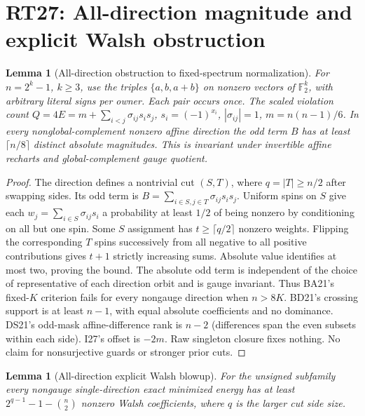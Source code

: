 \documentclass[11pt]{article}
\newtheorem{lemma}[theorem]{Lemma}
\begin{document}
\section{RT27: All-direction magnitude and explicit Walsh obstruction}\label{sec:rt27}
\begin{lemma}[All-direction obstruction to fixed-spectrum normalization]\label{lem:rt27-spectrum}
For $n=2^k-1$, $k\ge3$, use the triples $\{a,b,a+b\}$ on nonzero vectors of $\mathbb F_2^k$, with arbitrary literal signs per owner. Each pair occurs once. The scaled violation count $Q=4E=m+\sum_{i<j}\sigma_{ij}s_i s_j$, $s_i=(-1)^{x_i}$, $|\sigma_{ij}|=1$, $m=n(n-1)/6$. In every nonglobal-complement nonzero affine direction the odd term $B$ has at least $\lceil n/8\rceil$ distinct absolute magnitudes. This is invariant under invertible affine recharts and global-complement gauge quotient.
\end{lemma}
\begin{proof}
The direction defines a nontrivial cut $(S,T)$, where $q=|T|\ge n/2$ after swapping sides. Its odd term is $B=\sum_{i\in S,j\in T}\sigma_{ij}s_i s_j$. Uniform spins on $S$ give each $w_j=\sum_{i\in S}\sigma_{ij}s_i$ a probability at least $1/2$ of being nonzero by conditioning on all but one spin. Some $S$ assignment has $t\ge\lceil q/2\rceil$ nonzero weights. Flipping the corresponding $T$ spins successively from all negative to all positive contributions gives $t+1$ strictly increasing sums. Absolute value identifies at most two, proving the bound. The absolute odd term is independent of the choice of representative of each direction orbit and is gauge invariant. Thus BA21's fixed-$K$ criterion fails for every nongauge direction when $n>8K$. BD21's crossing support is at least $n-1$, with equal absolute coefficients and no dominance. DS21's odd-mask affine-difference rank is $n-2$ (differences span the even subsets within each side). I27's offset is $-2m$. Raw singleton closure fixes nothing. No claim for nonsurjective guards or stronger prior cuts.
\end{proof}
\begin{lemma}[All-direction explicit Walsh blowup]\label{lem:rt27-blowup}
For the unsigned subfamily every nongauge single-direction exact minimized energy has at least $2^{q-1}-1-\binom n2$ nonzero Walsh coefficients, where $q$ is the larger cut side size.
\end{lemma}
\end{document}
